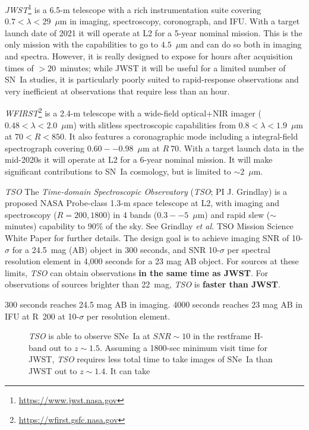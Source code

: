 \documentclass[12pt,preprint]{aastex}
\newcommand{\snia}{SN~Ia\xspace}
\newcommand{\sneia}{SNe~Ia\xspace}
\begin{document}
{\it JWST}\footnote{\url{https://www.jwst.nasa.gov}} is a 6.5-m telescope with a rich instrumentation suite covering $0.7<\lambda<29$~$\mu$m in imaging, spectroscopy, coronograph, and IFU.  With a target launch date of 2021 it will operate at L2 for a 5-year nominal mission.  This is the only mission with the capabilities to go to $4.5$~$\mu$m and can do so both in imaging and spectra.  However, it is really designed to expose for hours after acquisition times of $>20$~minutes; while JWST it will be useful for a limited number of \snia studies, it is particularly poorly suited to rapid-response observations and very inefficient at observations that require less than an hour.

{\it WFIRST}\footnote{\url{https://wfirst.gsfc.nasa.gov}} is a 2.4-m telescope with a wide-field optical+NIR imager ($0.48<\lambda<2.0$~$\mu$m) with slitless spectroscopic capabilities from $0.8<\lambda<1.9$~$\mu$m at $70<R<850$.  It also features a coronagraphic mode including a integral-field spectrograph covering $0.60--0.98$~$\mu$m at $R~70$.  With a target launch data in the mid-2020s it will operate at L2 for a 6-year nominal mission.  It will make significant contributions to \snia cosmology, but is limited to $\sim2$~$\mu$m.

{\it TSO}
The {\it Time-domain Spectroscopic Observatory} ({\it TSO}; PI J. Grindlay) is a proposed NASA Probe-class 1.3-m space telescope at L2, with imaging and spectroscopy ($R=200, 1800$) in 4 bands ($0.3--5$~$\mu$m) and rapid slew ($\sim$minutes) capability to 90\% of the sky.  See Grindlay {\it et al.} TSO Mission Science White Paper for further details.  The design goal is to achieve imaging SNR of 10-$\sigma$ for a 24.5~mag (AB) object in 300 seconds, and SNR 10-$\sigma$ per spectral resolution element in 4,000 seconds for a 23 mag AB object.  For sources at these limits, {\it TSO} can obtain observations {\bf in the same time as JWST}.  For observations of sources brighter than 22~mag, {\it TSO} is {\bf faster than JWST}.


300 seconds reaches 24.5 mag AB in imaging.
4000 seconds reaches 23 mag AB in IFU at R~200 at 10-$\sigma$ per resolution element.

\begin{figure}
\caption{{\it TSO} is able to observe \sneia at $SNR\sim10$ in the restframe H-band out to $z\sim1.5$.  Assuming a 1800-sec minimum visit time for JWST, {\it TSO} requires less total time to take images of \sneia than JWST out to $z\sim1.4$.  It can take 
    \label{fig:tso_jwst}
}

\end{figure}
\end{document}
